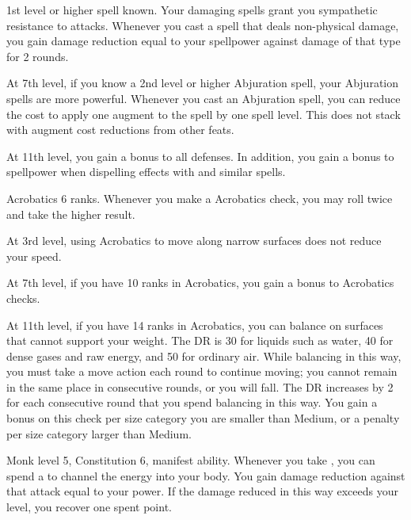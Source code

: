     \featpre 1st level or higher  spell known.
    \featben Your damaging spells grant you sympathetic resistance to attacks.
    Whenever you cast a spell that deals non-physical damage, you gain damage reduction equal to your spellpower against damage of that type for 2 rounds.

    At 7th level, if you know a 2nd level or higher Abjuration spell, your Abjuration spells are more powerful.
    Whenever you cast an Abjuration spell, you can reduce the cost to apply one augment to the spell by one spell level.
    This does not stack with augment cost reductions from other feats.

    At 11th level, you gain a  bonus to all defenses.
    In addition, you gain a  bonus to spellpower when dispelling effects with  and similar spells.

    \featpre Acrobatics 6 ranks.
    \featben Whenever you make a Acrobatics check, you may roll twice and take the higher result.

    At 3rd level, using Acrobatics to move along narrow surfaces does not reduce your speed.

    At 7th level, if you have 10 ranks in Acrobatics, you gain a  bonus to Acrobatics checks.

    At 11th level, if you have 14 ranks in Acrobatics, you can balance on surfaces that cannot support your weight.
    The DR is 30 for liquids such as water, 40 for dense gases and raw energy, and 50 for ordinary air.
    While balancing in this way, you must take a move action each round to continue moving; you cannot remain in the same place in consecutive rounds, or you will fall.
    The DR increases by 2 for each consecutive round that you spend balancing in this way.
    You gain a  bonus on this check per size category you are smaller than Medium, or a  penalty per size category larger than Medium.
    \magical

    \featpres Monk level 5, Constitution 6, manifest \ki ability.
    \featben Whenever you take , you can spend a  to channel the energy into your body.
    You gain damage reduction against that attack equal to your \ki power.
    If the damage reduced in this way exceeds your level, you recover one spent \ki point.

